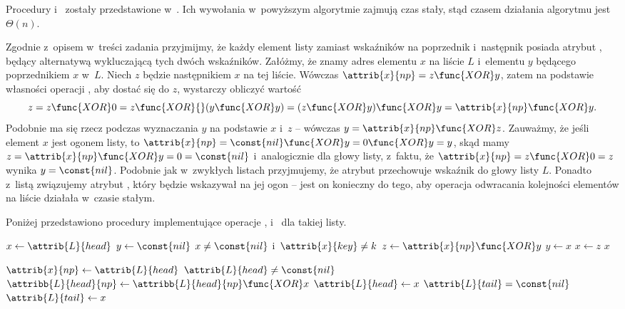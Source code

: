 Procedury  i~ zostały przedstawione w~.
Ich wywołania w~powyższym algorytmie zajmują czas stały, stąd czasem działania algorytmu jest $\Theta(n)$.

\exercise %
Zgodnie z~opisem w~treści zadania przyjmijmy, że każdy element listy zamiast wskaźników na poprzednik i~następnik posiada atrybut , będący alternatywą wykluczającą tych dwóch wskaźników.
Załóżmy, że znamy adres elementu $x$ na liście $L$ i~elementu $y$ będącego poprzednikiem $x$ w~$L$.
Niech $z$ będzie następnikiem $x$ na tej liście.
Wówczas $\attrib{x}{np}=z\func{XOR}y$, zatem na podstawie własności operacji , aby dostać się do $z$, wystarczy obliczyć wartość
\[
    z = z\func{XOR}0 = z\func{XOR}{}(y\func{XOR}y) = (z\func{XOR}y)\func{XOR}y = \attrib{x}{np}\func{XOR}y.
\]
Podobnie ma się rzecz podczas wyznaczania $y$ na podstawie $x$ i~$z$ -- wówczas $y=\attrib{x}{np}\func{XOR}z$.
Zauważmy, że jeśli element $x$ jest ogonem listy, to $\attrib{x}{np}=\const{nil}\func{XOR}y=0\func{XOR}y=y$, skąd mamy $z=\attrib{x}{np}\func{XOR}y=0=\const{nil}$ i~analogicznie dla głowy listy, z~faktu, że $\attrib{x}{np}=z\func{XOR}0=z$ wynika $y=\const{nil}$.
Podobnie jak w~zwykłych listach przyjmujemy, że atrybut  przechowuje wskaźnik do głowy listy $L$.
Ponadto z~listą związujemy atrybut , który będzie wskazywał na jej ogon -- jest on konieczny do tego, aby operacja odwracania kolejności elementów na liście działała w~czasie stałym.

Poniżej przedstawiono procedury implementujące operacje ,  i~ dla takiej listy.
\begin{codebox}
\li	$x\gets\attrib{L}{head}$
\li	$y\gets\const{nil}$
\li	\While $x\ne\const{nil}$ i~$\attrib{x}{key}\ne k$
\li		\Do $z\gets\attrib{x}{np}\func{XOR}y$
\li			$y\gets x$
\li			$x\gets z$
		\End
\li	\Return $x$
\end{codebox}

\begin{codebox}
\li	$\attrib{x}{np}\gets\attrib{L}{head}$
\li	\If $\attrib{L}{head}\ne\const{nil}$
\li		\Then $\attribb{L}{head}{np}\gets\attribb{L}{head}{np}\func{XOR}x$
		\End
\li	$\attrib{L}{head}\gets x$
\li	\If $\attrib{L}{tail}=\const{nil}$
\li		\Then $\attrib{L}{tail}\gets x$
		\End
\end{codebox}

